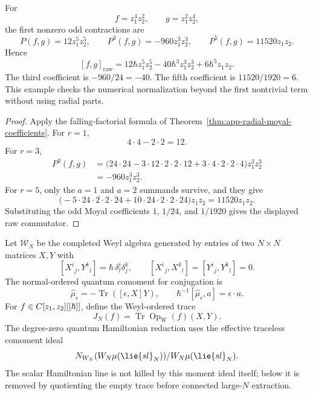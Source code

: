 \begin{ex}
\label{ex:app-radial-higher-moyal-check}
  For
  \[
    f=z_1^4z_2^2,\qquad g=z_1^2z_2^4,
  \]
  the first nonzero odd contractions are
  \[
    P(f,g)=12z_1^5z_2^5,\qquad
    P^3(f,g)=-960z_1^3z_2^3,\qquad
    P^5(f,g)=11520z_1z_2 .
  \]
  Hence
  \[
    [f,g]_{\mathrm{raw}}
      =
      12\hbar z_1^5z_2^5
      -40\hbar^3 z_1^3z_2^3
      +6\hbar^5 z_1z_2 .
  \]
  The third coefficient is \(-960/24=-40\).  The fifth coefficient is
  \(11520/1920=6\).  This example checks the numerical normalization
  beyond the first nontrivial term without using radial parts.
\end{ex}

\begin{proof}
  Apply the falling-factorial formula of
  Theorem~\ref{thm:app-radial-moyal-coefficients}.  For \(r=1\),
  \[
    4\cdot4-2\cdot2=12.
  \]
  For \(r=3\),
  \[
  \begin{aligned}
    P^3(f,g)
    &=
      \bigl(24\cdot24
      -3\cdot12\cdot2\cdot2\cdot12
      +3\cdot4\cdot2\cdot2\cdot4\bigr)z_1^3z_2^3  \\
    &=-960z_1^3z_2^3 .
  \end{aligned}
  \]
  For \(r=5\), only the \(a=1\) and \(a=2\) summands survive, and they
  give
  \[
    \bigl(-5\cdot24\cdot2\cdot2\cdot24
      +10\cdot24\cdot2\cdot2\cdot24\bigr)z_1z_2
    =
    11520z_1z_2 .
  \]
  Substituting the odd Moyal coefficients
  \(1\), \(1/24\), and \(1/1920\) gives the displayed raw commutator.
\end{proof}

\begin{defn}
\label{def:app-radial-matrix-weyl}
  Let \(\mathcal W_N\) be the completed Weyl algebra generated by
  entries of two \(N\times N\) matrices \(X,Y\) with
  \[
    [X^i{}_j,Y^k{}_l]=\hbar\,\delta^i_l\delta^k_j,\qquad
    [X^i{}_j,X^k{}_l]=[Y^i{}_j,Y^k{}_l]=0.
  \]
  The normal-ordered quantum comoment for conjugation is
  \[
    \widehat\mu_\epsilon=-\operatorname{Tr}([\epsilon,X]Y),
    \qquad
    \hbar^{-1}[\widehat\mu_\epsilon,a]=\epsilon\cdot a.
  \]
  For \(f\in C[z_1,z_2][[\hbar]]\), define the Weyl-ordered trace
  \[
    J_N(f)=\operatorname{Tr}\operatorname{Op}_{\mathrm W}(f)(X,Y).
  \]
  The degree-zero quantum Hamiltonian reduction uses the effective
  traceless comoment ideal
  \[
    \mathrm N_{\mathcal W_N}
      (\mathcal W_N\widehat\mu(\lie{sl}_N))/
    \mathcal W_N\widehat\mu(\lie{sl}_N).
  \]
  The scalar Hamiltonian line is not killed by this moment ideal itself;
  below it is removed by quotienting the empty trace before connected
  large-\(N\) extraction.
\end{defn}

